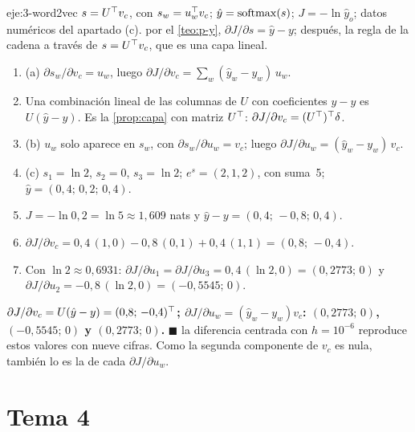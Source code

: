\begin{solucion}{eje:3-word2vec}
\datos $s=U^{\top} v_c$, con $s_w=u_w^{\top} v_c$; $\hat y=\operatorname{softmax}(s)$; $J=-\ln\hat y_o$; datos numéricos del apartado (c).
\planteamiento por el \cref{teo:p-y}, $\partial J/\partial s=\hat y-y$; después, la regla de la cadena a través de $s=U^{\top} v_c$, que es una capa lineal.
\pasos
\begin{enumerate}[label=\arabic*.]
  \item (a) $\partial s_w/\partial v_c=u_w$, luego $\partial J/\partial v_c=\sum_w(\hat y_w-y_w)\,u_w$.
  \item Una combinación lineal de las columnas de $U$ con coeficientes $\hat y-y$ es $U(\hat y-y)$. Es la \cref{prop:capa} con matriz $U^{\top}$: $\partial J/\partial v_c=(U^{\top})^{\top}\delta$.
  \item (b) $u_w$ solo aparece en $s_w$, con $\partial s_w/\partial u_w=v_c$; luego $\partial J/\partial u_w=(\hat y_w-y_w)\,v_c$.
  \item (c) $s_1=\ln 2$, $s_2=0$, $s_3=\ln 2$; $e^{s}=(2,1,2)$, con suma~5; $\hat y=(0{,}4;\,0{,}2;\,0{,}4)$.
  \item $J=-\ln 0{,}2=\ln 5\approx 1{,}609$ nats y $\hat y-y=(0{,}4;\,-0{,}8;\,0{,}4)$.
  \item $\partial J/\partial v_c=0{,}4\,(1,0)-0{,}8\,(0,1)+0{,}4\,(1,1)=(0{,}8;\,-0{,}4)$.
  \item Con $\ln 2\approx 0{,}6931$: $\partial J/\partial u_1=\partial J/\partial u_3=0{,}4\,(\ln 2,0)=(0{,}2773;\,0)$ y $\partial J/\partial u_2=-0{,}8\,(\ln 2,0)=(-0{,}5545;\,0)$.
\end{enumerate}
\resultado \textbf{$\partial J/\partial v_c=U(\hat y-y)=(0{,}8;\,-0{,}4)^{\top}$; $\partial J/\partial u_w=(\hat y_w-y_w)v_c$: $(0{,}2773;\,0)$, $(-0{,}5545;\,0)$ y $(0{,}2773;\,0)$.} $\blacksquare$
\comprobacion la diferencia centrada con $h=10^{-6}$ reproduce estos valores con nueve cifras. Como la segunda componente de $v_c$ es nula, también lo es la de cada $\partial J/\partial u_w$.
\end{solucion}

\section{Tema 4}

